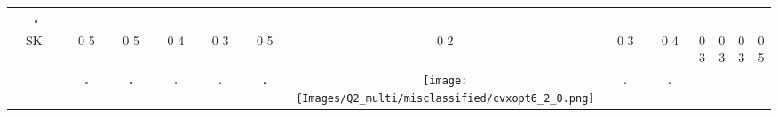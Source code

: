 \begin{enumerate}[label=(\alph*)]
\begin{center}
\begin{tabular}{c c c c c c c c c c c c c}
            \includegraphics[width=0.065\textwidth]{Images/Q2_multi/misclassified/sklearn12_5_0.png} \\
            SK: &
            {\color{red} 0} {\color{green} 5} &
            {\color{red} 0} {\color{green} 5} &
            {\color{red} 0} {\color{green} 4} &
            {\color{red} 0} {\color{green} 3} &
            {\color{red} 0} {\color{green} 5} &
            {\color{red} 0} {\color{green} 2} &
            {\color{red} 0} {\color{green} 3} &
            {\color{red} 0} {\color{green} 4} &
            {\color{red} 0} {\color{green} 3} &
            {\color{red} 0} {\color{green} 3} &
            {\color{red} 0} {\color{green} 3} &
            {\color{red} 0} {\color{green} 5} \\
            &
            \includegraphics[width=0.065\textwidth]{Images/Q2_multi/misclassified/cvxopt1_5_0.png} &
            \includegraphics[width=0.065\textwidth]{Images/Q2_multi/misclassified/cvxopt2_5_0.png} &
            \includegraphics[width=0.065\textwidth]{Images/Q2_multi/misclassified/cvxopt3_4_0.png} &
            \includegraphics[width=0.065\textwidth]{Images/Q2_multi/misclassified/cvxopt4_3_0.png} &
            \includegraphics[width=0.065\textwidth]{Images/Q2_multi/misclassified/cvxopt5_5_0.png} &
            \texttt{[image: \{Images/Q2\_multi/misclassified/cvxopt6\_2\_0.png]}} &
            \includegraphics[width=0.065\textwidth]{Images/Q2_multi/misclassified/cvxopt7_3_0.png} &
            \includegraphics[width=0.065\textwidth]{Images/Q2_multi/misclassified/cvxopt8_4_0.png} &

\end{tabular}
\end{center}
\end{enumerate}
